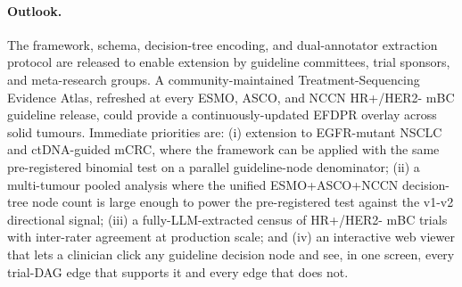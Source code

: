 \paragraph{Outlook.}
The framework, schema, decision-tree encoding, and dual-annotator extraction protocol are released to enable extension by guideline committees, trial sponsors, and meta-research groups. A community-maintained Treatment-Sequencing Evidence Atlas, refreshed at every ESMO, ASCO, and NCCN HR+/HER2- mBC guideline release, could provide a continuously-updated EFDPR overlay across solid tumours. Immediate priorities are: (i) extension to EGFR-mutant NSCLC and ctDNA-guided mCRC, where the framework can be applied with the same pre-registered binomial test on a parallel guideline-node denominator; (ii) a multi-tumour pooled analysis where the unified ESMO+ASCO+NCCN decision-tree node count is large enough to power the pre-registered test against the v1-v2 directional signal; (iii) a fully-LLM-extracted census of HR+/HER2- mBC trials with inter-rater agreement at production scale; and (iv) an interactive web viewer that lets a clinician click any guideline decision node and see, in one screen, every trial-DAG edge that supports it and every edge that does not.
